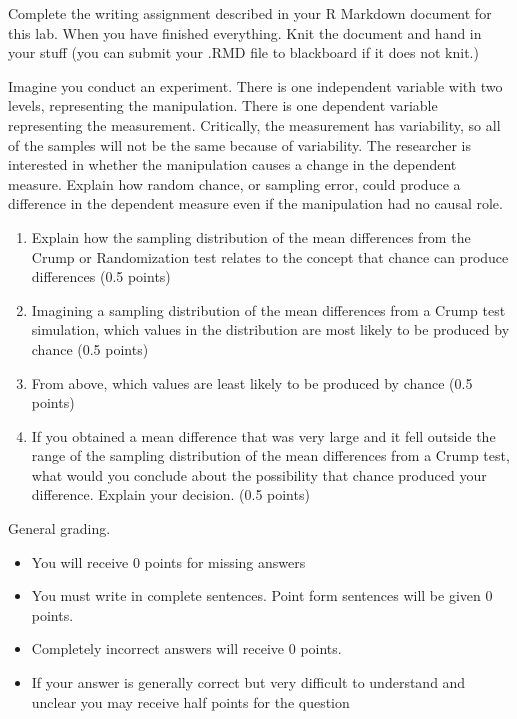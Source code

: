 \documentclass[
]{book}
\providecommand{\tightlist}{%
  \setlength{\itemsep}{0pt}\setlength{\parskip}{0pt}}
\begin{document}
Complete the writing assignment described in your R Markdown document for this lab. When you have finished everything. Knit the document and hand in your stuff (you can submit your .RMD file to blackboard if it does not knit.)

Imagine you conduct an experiment. There is one independent variable with two levels, representing the manipulation. There is one dependent variable representing the measurement. Critically, the measurement has variability, so all of the samples will not be the same because of variability. The researcher is interested in whether the manipulation causes a change in the dependent measure. Explain how random chance, or sampling error, could produce a difference in the dependent measure even if the manipulation had no causal role.

\begin{enumerate}
\def\labelenumi{\alph{enumi}.}
\item
  Explain how the sampling distribution of the mean differences from the Crump or Randomization test relates to the concept that chance can produce differences (0.5 points)
\item
  Imagining a sampling distribution of the mean differences from a Crump test simulation, which values in the distribution are most likely to be produced by chance (0.5 points)
\item
  From above, which values are least likely to be produced by chance (0.5 points)
\item
  If you obtained a mean difference that was very large and it fell outside the range of the sampling distribution of the mean differences from a Crump test, what would you conclude about the possibility that chance produced your difference. Explain your decision. (0.5 points)
\end{enumerate}

General grading.

\begin{itemize}
\tightlist
\item
  You will receive 0 points for missing answers
\item
  You must write in complete sentences. Point form sentences will be given 0 points.
\item
  Completely incorrect answers will receive 0 points.
\item
  If your answer is generally correct but very difficult to understand and unclear you may receive half points for the question
\end{itemize}
\end{document}

